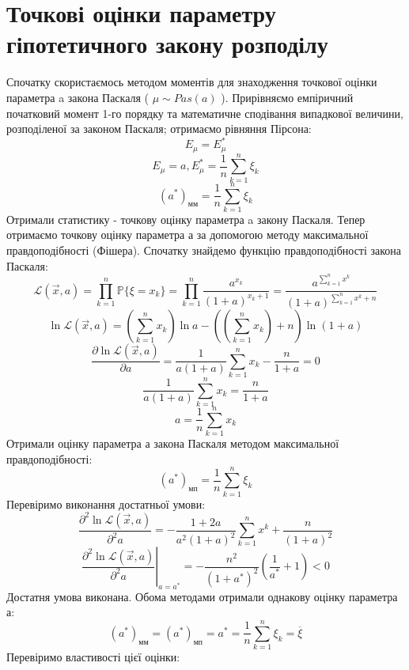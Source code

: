 \documentclass{article}
\begin{document}
\section{Точкові оцінки параметру гіпотетичного закону розподілу}
Спочатку скористаємось методом моментів для знаходження точкової 
оцінки параметра a закона Паскаля ( $\mu \sim Pas(a)$ ).
\newline
Прирівняємо емпіричний початковий момент 1-го порядку та математичне 
сподівання випадкової величини, розподіленої за законом Паскаля; 
отримаємо рівняння Пірсона: 
$$E_\mu = E^*_\mu$$
$$E_\mu = a, E^*_\mu = \frac{1}{n} \sum_{k = 1}^n \xi_k$$
\begin{equation}
  (a^*)_\text{мм} = \frac{1}{n} \sum_{k = 1}^n \xi_k
\end{equation}
Отримали статистику - точкову оцінку параметра a закону Паскаля.
\newline
Тепер отримаємо точкову оцінку параметра а за допомогою методу 
максимальної правдоподібності (Фішера). Спочатку знайдемо функцію 
правдоподібності закона Паскаля: 
$$\mathcal{L}( \vec{x}, a ) = \prod_{k = 1}^n \mathbb{P} 
\{\xi = x_k\} = \prod_{k = 1}^n \frac{a^{x_k}}{(1 + a)^{x_k + 1}} = 
\frac{a^{\sum_{k =1}^n x^k}}{(1 + a)^{\sum_{k =1}^n x^k + n}}$$
$$\ln \mathcal{L}( \vec{x}, a ) = (\sum_{k=1}^n x_k)\ln a - 
((\sum_{k=1}^n x_k) + n)\ln(1+a)$$
\begin{equation}
  \frac{\partial\ln \mathcal{L}( \vec{x}, a )}{\partial a} = 
  \frac{1}{a(1+a)}\sum_{k=1}^n x_k - \frac{n}{1+a} = 0
\end{equation}
$$\frac{1}{a(1+a)}\sum_{k=1}^n x_k = \frac{n}{1+a}$$
$$a = \frac{1}{n} \sum_{k=1}^n x_k$$
Отримали оцінку параметра а закона Паскаля методом 
максимальної правдоподібності:
\begin{equation}
  (a^*)_\text{мп} = \frac{1}{n}\sum_{k=1}^n \xi_k
\end{equation}
Перевіримо виконання достатньої умови:
$$\frac{\partial^2\ln \mathcal{L}( \vec{x}, a )}{\partial^2 a} = 
-\frac{1+2a}{a^2(1+a)^2}\sum_{k=1}^n x^k + \frac{n}{(1+a)^2}$$
\begin{equation}
  \left.{\frac{\partial^2\ln \mathcal{L}( \vec{x}, a )}{\partial^2 a}}
  \right|_{a = a^*} = -\frac{n^2}{(1+a^*)^2}({\frac{1}{a^*} + 1}) < 0
\end{equation}
Достатня умова виконана.
\newline
Обома методами отримали однакову оцінку параметра а:
$$(a^*)_{\text{мм}} = (a^*)_{\text{мп}} = a^* = \frac{1}{n}
\sum_{k=1}^n \xi_k = \overline{\xi}$$
Перевіримо властивості цієї оцінки:
\end{document}
